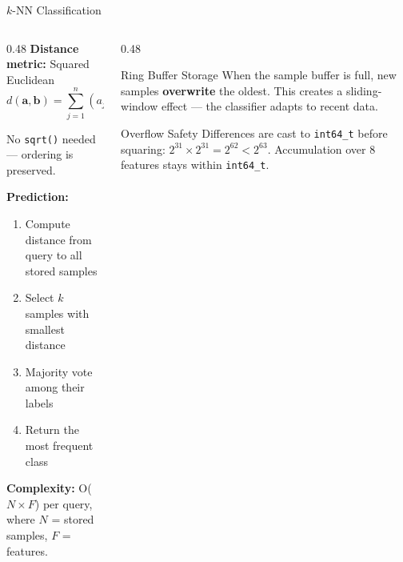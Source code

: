 \documentclass[aspectratio=169, 10pt]{beamer}
\begin{document}
\begin{frame}{$k$-NN Classification}
\begin{columns}[T]
\begin{column}{0.48\textwidth}
\textbf{Distance metric:} Squared Euclidean
\[
  d(\mathbf{a}, \mathbf{b}) = \sum_{j=1}^{n} (a_j - b_j)^2
\]

No \texttt{sqrt()} needed --- ordering is preserved.

\vspace{0.5em}
\textbf{Prediction:}
\begin{enumerate}
  \item Compute distance from query to all stored samples
  \item Select $k$ samples with smallest distance
  \item Majority vote among their labels
  \item Return the most frequent class
\end{enumerate}

\vspace{0.5em}
\textbf{Complexity:} O($N \times F$) per query,\\
where $N$ = stored samples, $F$ = features.
\end{column}

\begin{column}{0.48\textwidth}
\begin{block}{Ring Buffer Storage}
When the sample buffer is full, new samples \textbf{overwrite} the oldest.
This creates a sliding-window effect --- the classifier adapts to recent data.

\vspace{0.3em}
\begin{center}
\end{center}
\end{block}

\vspace{0.3em}
\begin{block}{Overflow Safety}
Differences are cast to \texttt{int64\_t} before squaring:
$2^{31} \times 2^{31} = 2^{62} < 2^{63}$.
Accumulation over 8 features stays within \texttt{int64\_t}.
\end{block}
\end{column}
\end{columns}
\end{frame}
\end{document}
